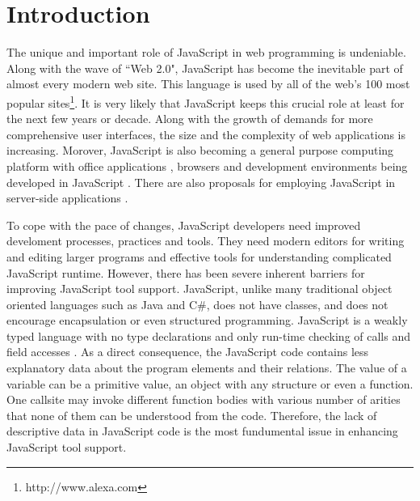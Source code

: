 \documentclass[10pt, preprint]{sigplanconf}
\begin{document}
\section{Introduction}
The unique and important role of JavaScript in web programming is undeniable. Along with the wave of ``Web 2.0", JavaScript has become the inevitable part of almost every modern web site. This language is used by all of the web's 100 most popular sites\footnote[1]{http://www.alexa.com}. It is very likely that JavaScript keeps this crucial role at least for the next few years or decade. Along with the growth of demands for more comprehensive user interfaces, the size and the complexity of web applications is increasing. Morover, JavaScript is also becoming a general purpose computing platform with office applications \cite{JSOffice, JSOffice2}, browsers \cite{FAO, GCE} and development environments \cite{Ingalls} being developed in JavaScript \cite{Richards}. There are also proposals for employing JavaScript in server-side applications \cite{SSJSR, CJS}.

To cope with the pace of changes, JavaScript developers need improved develoment processes, practices and tools. They need modern editors for writing and editing larger programs and effective tools for understanding complicated JavaScript runtime. However, there has been severe inherent barriers for improving JavaScript tool support. 
JavaScript, unlike many traditional object oriented languages such as Java and C\#, does not have classes, and does not encourage encapsulation or even structured programming. JavaScript is a weakly typed language with no type declarations and only run-time checking of calls and field accesses \cite{Richards}. As a direct consequence, the JavaScript code contains less explanatory data about the program elements and their relations. The value of a variable can be a primitive value, an object with any structure or even a function. One callsite may invoke different function bodies with various number of arities that none of them can be understood from the code. Therefore, the lack of descriptive data in JavaScript code is the most fundumental issue in enhancing JavaScript tool support.
\end{document}
